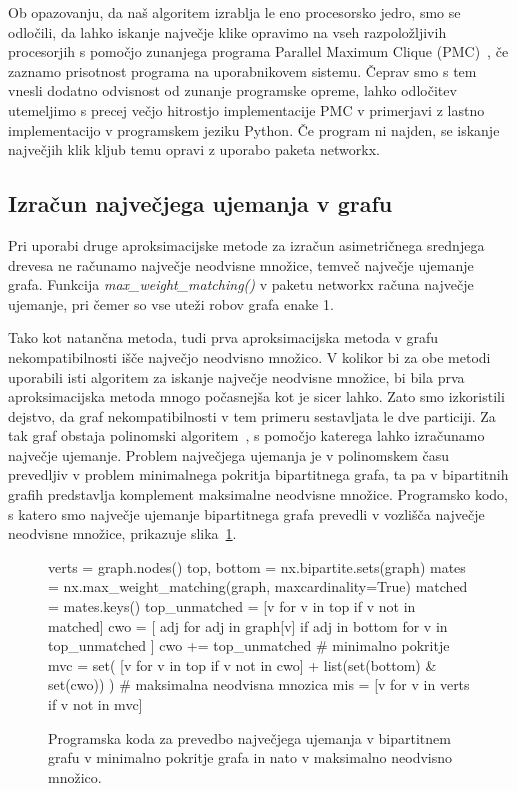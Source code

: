 \documentclass[a4paper, 12pt]{book}
\begin{document}
Ob opazovanju, da naš algoritem izrablja le eno procesorsko jedro, smo
se odločili, da lahko iskanje največje klike opravimo na vseh razpoložljivih 
procesorjih s pomočjo zunanjega programa Parallel Maximum Clique (PMC)~\cite{pmc},
če zaznamo prisotnost programa na uporabnikovem sistemu. Čeprav smo s tem
vnesli dodatno odvisnost od zunanje programske opreme, lahko odločitev utemeljimo
s precej večjo hitrostjo implementacije PMC v primerjavi z lastno implementacijo
v programskem jeziku Python. Če program ni najden, se iskanje največjih 
klik kljub temu opravi z uporabo paketa networkx.

\subsection{Izračun največjega ujemanja v grafu}
Pri uporabi druge aproksimacijske metode za izračun asimetričnega 
srednjega drevesa ne računamo največje neodvisne množice, 
temveč največje ujemanje grafa. Funkcija {\it max\_weight\_matching()}
v paketu networkx računa največje ujemanje, pri čemer 
so vse uteži robov grafa enake 1.

Tako kot natančna metoda, tudi prva aproksimacijska metoda v grafu
nekompatibilnosti išče največjo neodvisno množico. V kolikor bi za
obe metodi uporabili isti algoritem za iskanje največje neodvisne 
množice, bi bila prva aproksimacijska metoda mnogo počasnejša kot
je sicer lahko. Zato smo izkoristili dejstvo, da graf nekompatibilnosti
v tem primeru sestavljata le dve particiji. Za tak graf obstaja
polinomski algoritem~\cite{hopcroft-karp}, s pomočjo katerega 
lahko izračunamo največje ujemanje. Problem največjega ujemanja
je v polinomskem času prevedljiv v problem minimalnega pokritja 
bipartitnega grafa, ta pa v bipartitnih grafih predstavlja komplement 
maksimalne neodvisne množice. Programsko kodo, s katero smo največje
ujemanje bipartitnega grafa prevedli v vozlišča največje neodvisne
množice, prikazuje slika~\ref{code-mm-to-mvc-to-mis}.

\begin{figure}[h!]
\begin{python}
verts = graph.nodes()
top, bottom = nx.bipartite.sets(graph)
mates = nx.max_weight_matching(graph, maxcardinality=True)
matched = mates.keys()
top_unmatched = [v for v in top if v not in matched]
cwo = [
    adj for adj in graph[v] if adj in bottom
    for v in top_unmatched
]
cwo += top_unmatched
# minimalno pokritje
mvc = set(
    [v for v in top if v not in cwo] 
    + list(set(bottom) & set(cwo))
)
# maksimalna neodvisna mnozica
mis = [v for v in verts if v not in mvc]
\end{python}
\caption{
	Programska koda za prevedbo največjega ujemanja v bipartitnem 
	grafu v minimalno pokritje grafa in nato v maksimalno neodvisno 
	množico. 
}
\label{code-mm-to-mvc-to-mis}
\end{figure}
\end{document}
